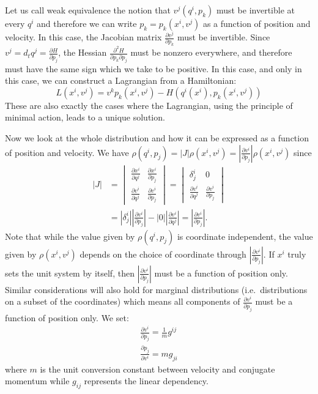 \documentclass[11pt,letterpaper,fleqn]{memoir} %
\begin{document}
Let us call weak equivalence the notion that $v^j(q^i, p_k)$ must be invertible at every $q^i$ and therefore we can write $p_k= p_k(x^i, v^j)$ as a function of position and velocity. In this case, the Jacobian matrix  $\frac{\partial v^j}{\partial p_k}$ must be invertible. Since $v^j = d_t q^j = \frac{\partial H}{\partial p_j}$, the Hessian $\frac{\partial^2 H}{\partial p_k \partial p_j}$ must be nonzero everywhere, and therefore must have the same sign which we take to be positive. In this case, and only in this case, we can construct a Lagrangian from a Hamiltonian:
\begin{equation}
L(x^i, v^j) = v^k p_k (x^i, v^j) - H(q^i(x^i), p_k(x^i, v^j))
\end{equation}
These are also exactly the cases where the Lagrangian, using the principle of minimal action, leads to a unique solution.

Now we look at the whole distribution and how it can be expressed as a function of position and velocity. We have $\rho(q^i, p_j) = |J| \rho(x^i, v^j) = \left|\frac{\partial v^i}{\partial p_j}\right| \rho(x^i, v^j)$ since
\begin{equation}
\begin{aligned}
|J| &= \begin{vmatrix}
\frac{\partial x^i}{\partial q^j} & \frac{\partial x^i}{\partial p_j} \\
\frac{\partial v^i}{\partial q^j} & \frac{\partial v^i}{\partial p_j}
\end{vmatrix}
= \begin{vmatrix}
\delta^i_j & 0 \\
\frac{\partial v^i}{\partial q^j} & \frac{\partial v^i}{\partial p_j}
\end{vmatrix} \\
&= \left|\delta^i_j\right| \left|\frac{\partial v^i}{\partial p_j}\right| - \left|0\right| \left|\frac{\partial v^i}{\partial q^j}\right|
= \left|\frac{\partial v^i}{\partial p_j}\right|.
\end{aligned}
\end{equation}
Note that while the value given by $\rho(q^i, p_j)$ is coordinate independent, the value given by $\rho(x^i, v^j)$ depends on the choice of coordinate through $\left|\frac{\partial v^i}{\partial p_j}\right|$. If $x^i$ truly sets the unit system by itself, then $\left|\frac{\partial v^i}{\partial p_j}\right|$ must be a function of position only. Similar considerations will also hold for marginal distributions (i.e.~distributions on a subset of the coordinates) which means all components of $\frac{\partial v^i}{\partial p_j}$ must be a function of position only. We set:
\begin{equation}
\begin{aligned}
\frac{\partial v^i}{\partial p_j} = \frac{1}{m} g^{ij} \\
\frac{\partial p_j}{\partial v^i} = m g_{ji}
\end{aligned}
\end{equation}
where $m$ is the unit conversion constant between velocity and conjugate momentum while $g_{ij}$ represents the linear dependency.
\end{document}
